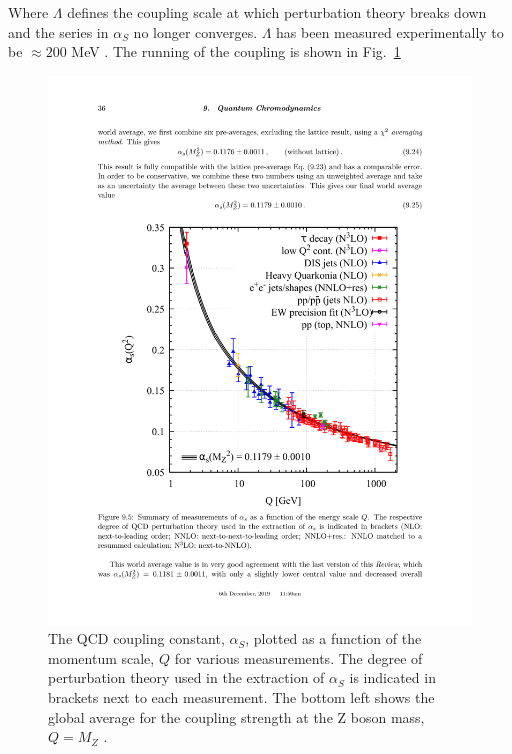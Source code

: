   Where $\Lambda$ defines the coupling scale at which perturbation theory breaks down and the series in  $\alpha_S$ no longer converges. $\Lambda$ has been measured experimentally to be  $\approx 200$ MeV \cite{Bettini2008}. The running of the coupling is shown in Fig.~\ref{fig:a_S_running}

  \begin{figure}[htpb]
    \centering
    \includegraphics[trim={3.5cm 5.9cm 3cm 7cm},clip,width=1.0\textwidth] {Introduction/a_S_running.pdf}
    \caption{The QCD coupling constant, $\alpha_S$, plotted as a function of the momentum scale,  $Q$ for various measurements. The degree of perturbation theory used in the extraction of  $\alpha_S$ is indicated in brackets next to each measurement. The bottom left shows the global average for the coupling strength at the Z boson mass, $Q=M_Z$ \cite{zotero-314}.}
    \label{fig:a_S_running}
  \end{figure}
  

